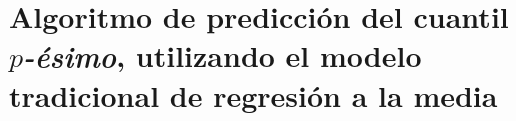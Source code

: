\chapter{Algoritmo de predicci\'on del cuantil $p$\textit{-\'esimo}, utilizando el modelo tradicional de regresi\'on a la media} \label{trad_mean_alg}


\newpage